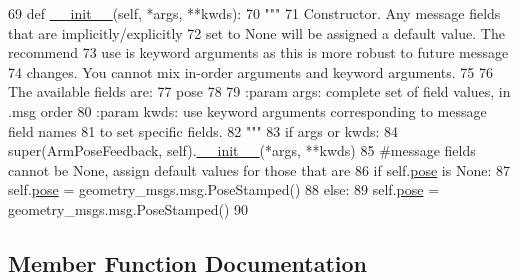 \begin{DoxyCode}
69   \textcolor{keyword}{def }\hyperlink{classjaco__msgs_1_1msg_1_1__ArmPoseFeedback_1_1ArmPoseFeedback_a279364691f4ad67e80ad2c98e902e99b}{\_\_init\_\_}(self, *args, **kwds):
70     \textcolor{stringliteral}{"""}
71 \textcolor{stringliteral}{    Constructor. Any message fields that are implicitly/explicitly}
72 \textcolor{stringliteral}{    set to None will be assigned a default value. The recommend}
73 \textcolor{stringliteral}{    use is keyword arguments as this is more robust to future message}
74 \textcolor{stringliteral}{    changes.  You cannot mix in-order arguments and keyword arguments.}
75 \textcolor{stringliteral}{}
76 \textcolor{stringliteral}{    The available fields are:}
77 \textcolor{stringliteral}{       pose}
78 \textcolor{stringliteral}{}
79 \textcolor{stringliteral}{    :param args: complete set of field values, in .msg order}
80 \textcolor{stringliteral}{    :param kwds: use keyword arguments corresponding to message field names}
81 \textcolor{stringliteral}{    to set specific fields.}
82 \textcolor{stringliteral}{    """}
83     \textcolor{keywordflow}{if} args \textcolor{keywordflow}{or} kwds:
84       super(ArmPoseFeedback, self).\hyperlink{classjaco__msgs_1_1msg_1_1__ArmPoseFeedback_1_1ArmPoseFeedback_a279364691f4ad67e80ad2c98e902e99b}{\_\_init\_\_}(*args, **kwds)
85       \textcolor{comment}{#message fields cannot be None, assign default values for those that are}
86       \textcolor{keywordflow}{if} self.\hyperlink{classjaco__msgs_1_1msg_1_1__ArmPoseFeedback_1_1ArmPoseFeedback_a9d4fd79ad0f686d06e0aec8f2b046b37}{pose} \textcolor{keywordflow}{is} \textcolor{keywordtype}{None}:
87         self.\hyperlink{classjaco__msgs_1_1msg_1_1__ArmPoseFeedback_1_1ArmPoseFeedback_a9d4fd79ad0f686d06e0aec8f2b046b37}{pose} = geometry\_msgs.msg.PoseStamped()
88     \textcolor{keywordflow}{else}:
89       self.\hyperlink{classjaco__msgs_1_1msg_1_1__ArmPoseFeedback_1_1ArmPoseFeedback_a9d4fd79ad0f686d06e0aec8f2b046b37}{pose} = geometry\_msgs.msg.PoseStamped()
90 
\end{DoxyCode}


\subsection{Member Function Documentation}
